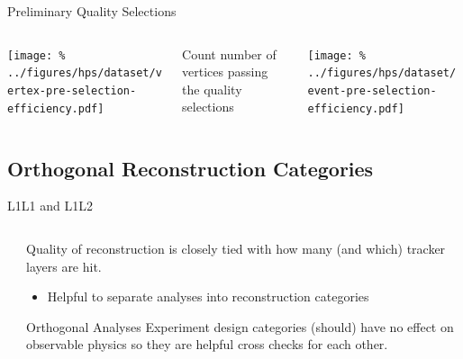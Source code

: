 \documentclass[aspectratio=169]{beamer}
\begin{document}
\begin{frame}{Preliminary Quality Selections}
  \begin{columns}
    \begin{column}{0.35\textwidth}
      \centering
      \texttt{[image: \%
        ../figures/hps/dataset/vertex-pre-selection-efficiency.pdf]}
    \end{column}
    \begin{column}{0.3\textwidth}
      Count number of vertices passing the
      quality selections
    \end{column}
    \begin{column}{0.35\textwidth}
      \centering
      \texttt{[image: \%
        ../figures/hps/dataset/event-pre-selection-efficiency.pdf]}
    \end{column}
  \end{columns}
\end{frame}


\subsection{Orthogonal Reconstruction Categories}
\begin{frame}{L1L1 and L1L2}
  \begin{columns}
    \begin{column}{0.3\textwidth}
      \resizebox{\textwidth}{!}{}
      \resizebox{\textwidth}{!}{}
    \end{column}
    \begin{column}{0.6\textwidth}
      Quality of reconstruction is closely tied with how many (and which)
      tracker layers are hit.
      \begin{itemize}
        \item Helpful to separate analyses into reconstruction categories
      \end{itemize}
      \vfill
      \begin{block}{Orthogonal Analyses}
        Experiment design categories (should) have no effect on observable
        physics so they are helpful cross checks for each other.
      \end{block}
    \end{column}
  \end{columns}
\end{frame}
\end{document}
